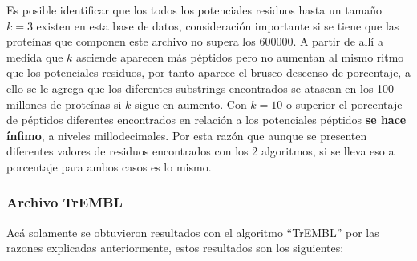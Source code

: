 Es posible identificar que los todos los potenciales residuos hasta un tamaño $k=3$ existen en esta base de datos, consideración importante si se tiene que las proteínas que componen este archivo no supera los 600000. A partir de allí a medida que $k$ asciende aparecen más péptidos pero no aumentan al mismo ritmo que los potenciales residuos, por tanto aparece el brusco descenso de porcentaje, a ello se le agrega que los diferentes substrings encontrados se atascan en los 100 millones de proteínas si $k$ sigue en aumento. Con $k=10$ o superior el porcentaje de péptidos diferentes encontrados en relación a los potenciales péptidos \textbf{se hace ínfimo}, a niveles millodecimales. Por esta razón que aunque se presenten diferentes valores de residuos encontrados con los 2 algoritmos, si se lleva eso a porcentaje para ambos casos es lo mismo.

\subsubsection{Archivo TrEMBL}

Acá solamente se obtuvieron resultados con el algoritmo ``TrEMBL'' por las razones explicadas anteriormente, estos resultados son los siguientes:

